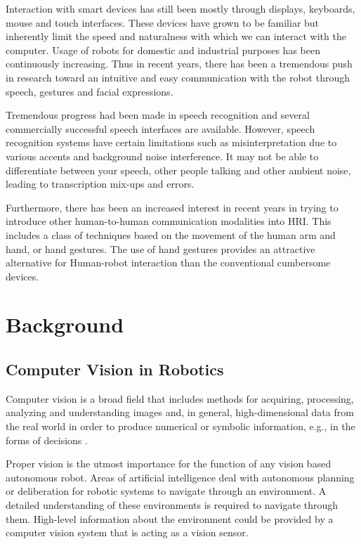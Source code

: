 Interaction with smart devices has still been mostly through displays, keyboards, mouse and touch interfaces. These devices have grown to be familiar but inherently limit the speed and naturalness with which we can interact with the computer.  Usage of robots for domestic and industrial purposes has been continuously increasing. Thus in recent years, there has been a tremendous push in research toward an intuitive and easy communication with the robot through speech, gestures and facial expressions.

Tremendous progress had been made in speech recognition and several commercially successful speech interfaces are available. However, speech recognition systems have certain limitations such as misinterpretation due to various accents and background noise interference. It may not be able to differentiate between your speech, other people talking and other ambient noise, leading to transcription mix-ups and errors.

 Furthermore, there has been an increased interest in recent years in trying to introduce other human-to-human communication modalities into HRI. This includes a class of techniques based on the movement of the human arm and hand, or hand gestures. The use of hand gestures provides an attractive alternative for Human-robot interaction than the conventional cumbersome devices. 

\chapter{Background} 
\section{Computer Vision in Robotics} Computer vision is a broad field that includes methods for acquiring, processing, analyzing and understanding images and, in general, high-dimensional data from the real world in order to produce numerical or symbolic information, e.g., in the forms of decisions \cite{1}.

Proper vision is the utmost importance for the function of any vision based autonomous robot. Areas of artificial intelligence deal with autonomous planning or deliberation for robotic systems to navigate through an environment. A detailed understanding of these environments is required to navigate through them. High-level information about the environment could be provided by a computer vision system that is acting as a vision sensor.

